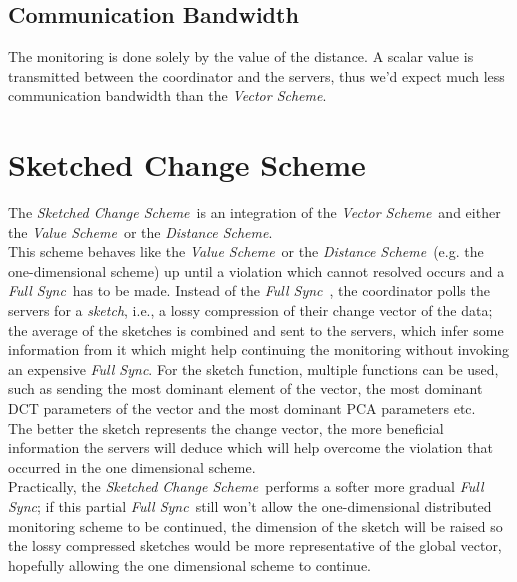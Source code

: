\documentclass[10pt, conference]{IEEEtran}
\newcommand{\vectorScheme}{\textit{Vector Scheme}}
\newcommand{\valueScheme}{\textit{Value Scheme}}
\newcommand{\distanceScheme}{\textit{Distance Scheme}}
\newcommand{\sketchScheme}{\textit{Sketched Change Scheme}}
\newcommand{\fullSync}{\textit{Full Sync}}
\begin{document}
\subsection{Communication Bandwidth}
The monitoring is done solely by the value of the distance. A scalar value is transmitted between the coordinator and the servers, thus we'd expect much less communication bandwidth than the \vectorScheme .

\section{Sketched Change Scheme}
The \sketchScheme \ is an integration of the \vectorScheme \ and either the \valueScheme \ or the \distanceScheme . \\
This scheme behaves like the \valueScheme \ or the \distanceScheme \ (e.g. the one-dimensional scheme) up until a violation which cannot resolved occurs and a \fullSync \ has to be made. Instead of the \fullSync \ , the coordinator polls the servers for a \textit{sketch}, i.e., a lossy compression of their change vector of the data; the average of the sketches is combined and sent to the servers, which infer some information from it which might help continuing the monitoring without invoking an expensive \fullSync. For the sketch function, multiple functions can be used, such as sending the most dominant element of the vector, the most dominant DCT parameters of the vector and the most dominant PCA parameters etc. \\
The better the sketch represents the change vector, the more beneficial information the servers will deduce which will help overcome the violation that occurred in the one dimensional scheme. \\
Practically, the \sketchScheme \ performs a softer more gradual \fullSync; if this partial \fullSync \ still won't allow the one-dimensional distributed monitoring scheme to be continued, the dimension of the sketch will be raised so the lossy compressed sketches would be more representative of the global vector, hopefully allowing the one dimensional scheme to continue. \\
\end{document}
